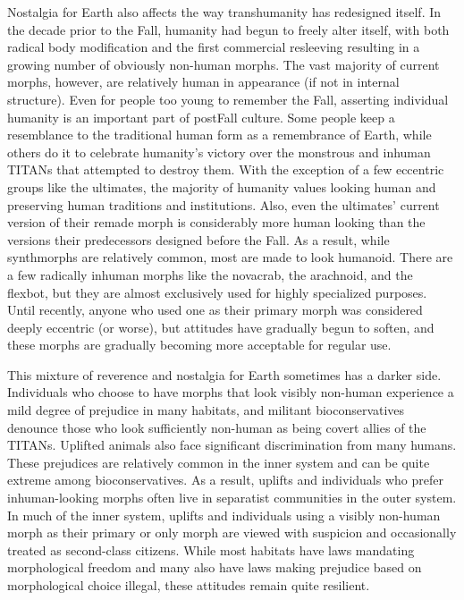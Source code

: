Nostalgia for Earth also affects the way transhumanity has redesigned
itself. In the decade prior to the Fall, humanity had begun to freely
alter itself, with both radical body modification and the first
commercial resleeving resulting in a growing number of obviously
non-human morphs. The vast majority of current morphs, however, are
relatively human in appearance (if not in internal structure). Even
for people too young to remember the Fall, asserting individual
humanity is an important part of postFall culture. Some people keep a
resemblance to the traditional human form as a remembrance of Earth,
while others do it to celebrate humanity's victory over the monstrous
and inhuman TITANs that attempted to destroy them. With the exception
of a few eccentric groups like the ultimates, the majority of humanity
values looking human and preserving human traditions and
institutions. Also, even the ultimates' current version of their
remade morph is considerably more human looking than the versions
their predecessors designed before the Fall. As a result, while
synthmorphs are relatively common, most are made to look
humanoid. There are a few radically inhuman morphs like the novacrab,
the arachnoid, and the flexbot, but they are almost exclusively used
for highly specialized purposes. Until recently, anyone who used one
as their primary morph was considered deeply eccentric (or worse), but
attitudes have gradually begun to soften, and these morphs are
gradually becoming more acceptable for regular use.

This mixture of reverence and nostalgia for Earth sometimes has a
darker side. Individuals who choose to have morphs that look visibly
non-human experience a mild degree of prejudice in many habitats, and
militant bioconservatives denounce those who look sufficiently
non-human as being covert allies of the TITANs. Uplifted animals also
face significant discrimination from many humans. These prejudices are
relatively common in the inner system and can be quite extreme among
bioconservatives. As a result, uplifts and individuals who prefer
inhuman-looking morphs often live in separatist communities in the
outer system. In much of the inner system, uplifts and individuals
using a visibly non-human morph as their primary or only morph are
viewed with suspicion and occasionally treated as second-class
citizens. While most habitats have laws mandating morphological
freedom and many also have laws making prejudice based on
morphological choice illegal, these attitudes remain quite resilient.

